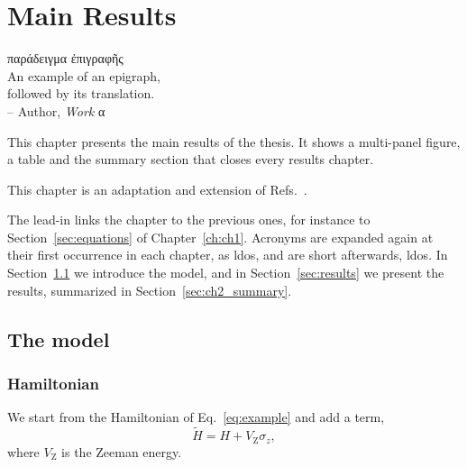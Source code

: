 \documentclass[../main]{subfiles}
\begin{document}
\ifSubfilesClassLoaded{\setcounter{chapter}{1}}{}

\chapter{Main Results}
\label{ch:ch2}
\begin{chquote}
\foreignlanguage{greek}{παράδειγμα ἐπιγραφῆς} \\
\vspace{1em}
An example of an epigraph, \\
followed by its translation. \\
\bigskip
-- Author, \textit{Work} \foreignlanguage{greek}{α}
\end{chquote}

\begin{chabstract}
This chapter presents the main results of the thesis.
It shows a multi-panel figure, a table and the summary section that closes every results chapter.
\end{chabstract}

\begin{disclaimer}
This chapter is an adaptation and extension of Refs.~\cite{Doe:PRB24, Roe:PRL25, Doe:SP25}.
\end{disclaimer}

\clearpage
The lead-in links the chapter to the previous ones, for instance to Section~\ref{sec:equations} of Chapter~\ref{ch:ch1}.
Acronyms are expanded again at their first occurrence in each chapter, as \acrfull{ldos}, and are short afterwards, \acrshort{ldos}.
\lipsum[1][1-5]
In Section~\ref{sec:model} we introduce the model, and in Section~\ref{sec:results} we present the results, summarized in Section~\ref{sec:ch2_summary}.

\section{The model}
\label{sec:model}
\lipsum[2][1-4]

\subsection{Hamiltonian}
\label{sec:hamiltonian}
We start from the Hamiltonian of Eq.~\eqref{eq:example} and add a term,
\begin{equation}
    \label{eq:ch2_hamiltonian}
    \tilde{H} = H + V_\text{Z}\sigma_z,
\end{equation}
where $V_\text{Z}$ is the Zeeman energy.
\lipsum[3][1-5]
\end{document}
